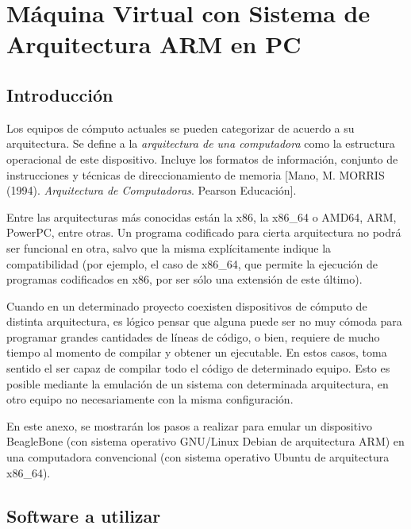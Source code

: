 
\chapter{Máquina Virtual con Sistema de Arquitectura ARM en PC}\label{Anx:qemu}
\section{Introducción}

Los equipos de cómputo actuales se pueden categorizar de acuerdo a su arquitectura. Se define a la \textit{arquitectura de una computadora} como la estructura operacional de este dispositivo. Incluye los formatos de información, conjunto de instrucciones y técnicas de direccionamiento de memoria [Mano, M. MORRIS (1994). \textit{Arquitectura de Computadoras}. Pearson Educación].

Entre las arquitecturas más conocidas están la x86, la x86\_64 o AMD64, ARM, PowerPC, entre otras. Un programa codificado para cierta arquitectura no podrá ser funcional en otra, salvo que la misma explícitamente indique la compatibilidad (por ejemplo, el caso de x86\_64, que permite la ejecución de programas codificados en x86, por ser sólo una extensión de este último).

Cuando en un determinado proyecto coexisten dispositivos de cómputo de distinta arquitectura, es lógico pensar que alguna puede ser no muy cómoda para programar grandes cantidades de líneas de código, o bien, requiere de mucho tiempo al momento de compilar y obtener un ejecutable. En estos casos, toma sentido el ser capaz de compilar todo el código de determinado equipo. Esto es posible mediante la emulación de un sistema con determinada arquitectura, en otro equipo no necesariamente con la misma configuración.

En este anexo, se mostrarán los pasos a realizar para emular un dispositivo BeagleBone (con sistema operativo GNU/Linux Debian de arquitectura ARM) en una computadora convencional (con sistema operativo Ubuntu de arquitectura x86\_64).


\section{Software a utilizar}

